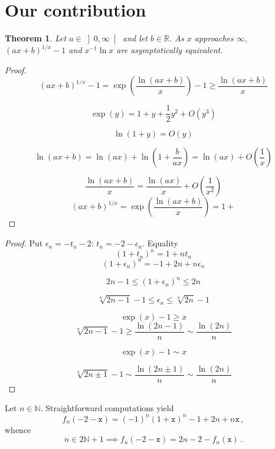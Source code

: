 \documentclass[12pt]{article}
\newcommand{\bR}{\mathbb{R}}
\newcommand{\bN}{\mathbb{N}}
\newcommand{\gtint}[1]{\left] #1, \infty \right[}
\newcommand{\ttx}{\mathtt{x}}
\newtheorem{theorem}{Theorem}
\begin{document}
\section{Our contribution}

\begin{theorem}
  Let $a \in \gtint{0}$ and let $b \in \bR$.
 As $x$ approaches $\infty$, 
 ${(a x + b)}^{1 / x} - 1$
 and
 $x^{-1} \ln x$ are asymptotically equivalent.
\end{theorem}

\begin{proof}
  
  $$
  {(a x + b)}^{1 / x} - 1 = \exp \left( \frac{\ln (a x + b)}{x} \right) - 1 \ge   \frac{\ln (a x + b)}{x} 
  $$
  
  $$
  \exp(y) = 1 + y + \frac{1}{2} y^2 + O(y^3)  
  $$

  $$
  \ln(1 + y) = O(y) 
  $$

  $$
  \ln(a x + b) = \ln (a x) + \ln \left(1 +  \frac{b}{a x} \right) = \ln(a x) + O \left( \frac{1} {x} \right)
  $$

  $$
   \frac{\ln(ax + b)}{x} = \frac{\ln(a x)}{x} + O \left( \frac{1}{x^2} \right)
  $$
  $$
  {(a x + b)}^{1 / x} = \exp \left( \frac{\ln( a x + b)}{x}  \right) = 1 + 
  $$
\end{proof} 

\begin{proof}
  Put $\epsilon_n = - t_n - 2$: $t_n = - 2 - \epsilon_n$.
  Equality
  $$
  {(1 + t_n)}^n = 1 + n t_n 
  $$
  $$
   {(1 + \epsilon_n)}^n  = - 1 + 2 n + n \epsilon_n 
   $$

   $$
   2 n - 1 \le {(1 + \epsilon_n)}^n  \le  2 n 
   $$

   $$
   \sqrt[n]{2 n - 1} - 1 \le \epsilon_n  \le \sqrt[n]{2 n} - 1
   $$

   $$
   \exp(x) - 1 \ge x
   $$
   $$
   \sqrt[n]{2n - 1} - 1 \ge \frac{\ln(2n - 1)}{n} \sim \frac{\ln(2n)}{n} 
   $$

   $$
   \exp(x) - 1 \sim  x
   $$
   
   $$
   \sqrt[n]{2n \pm 1} - 1 \sim \frac{\ln(2n \pm 1)}{n} \sim \frac{\ln(2n)}{n} 
   $$
   
\end{proof}
Let $n \in \bN$.
Straightforward computations yield
$$
f_n(- 2 - \ttx) = {(- 1)}^n {(1 + \ttx)}^n - 1 + 2n + n \ttx \, , 
$$
whence 
\begin{equation} \label{eq:fn-2-x-odd}
  n \in 2 \bN + 1
  \implies 
 f_n(- 2 - \ttx) = 2n - 2 - f_n(\ttx)   \, .
\end{equation} 
 
\end{document}
